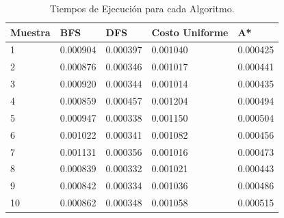 \documentclass[letter, titlepage, 10pt]{article}
\begin{document}
\begin{appendices}
\begin{table}[H]
\begin{center}
\begin{tabular}{|l|l|l|l|l|}
\hline
\textbf{Muestra} & \textbf{BFS} & \textbf{DFS}  & \textbf{Costo Uniforme}   & \textbf{A*}   \\ \hline
1                & 0.000904     & 0.000397      & 0.001040                  & 0.000425      \\ \hline
2                & 0.000876     & 0.000346      & 0.001017                  & 0.000441      \\ \hline
3                & 0.000920     & 0.000344      & 0.001014                  & 0.000435      \\ \hline
4                & 0.000859     & 0.000457      & 0.001204                  & 0.000494      \\ \hline
5                & 0.000947     & 0.000338      & 0.001150                  & 0.000504      \\ \hline
6                & 0.001022     & 0.000341      & 0.001082                  & 0.000456      \\ \hline
7                & 0.001131     & 0.000356      & 0.001016                  & 0.000473      \\ \hline
8                & 0.000839     & 0.000332      & 0.001021                  & 0.000443      \\ \hline
9                & 0.000842     & 0.000334      & 0.001036                  & 0.000486      \\ \hline
10               & 0.000862     & 0.000348      & 0.001058                  & 0.000515      \\ \hline
\end{tabular}
\caption{Tiempos de Ejecución para cada Algoritmo.}
\end{center}
\end{table}

\end{appendices}


\end{document}
